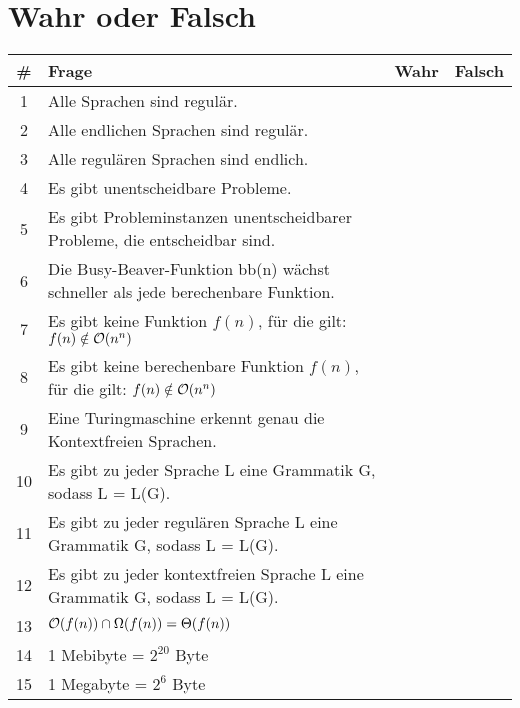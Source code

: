 \documentclass[a4paper,12pt]{article}
\begin{document}
\pagebreak

\section{Wahr oder Falsch}
\begin{table}[h]
	\begin{tabular}{| c | p{12 cm}  | c | c |}
	\hline
	\textbf{\#} & \textbf{Frage} & \textbf{Wahr} & \textbf{Falsch} \\
	\hline
	\hline
	1 & Alle Sprachen sind regulär.           &  \Square &  \Square \\
	\hline
	2 & Alle endlichen Sprachen sind regulär. &  \Square &  \Square \\
	\hline
	3 & Alle regulären Sprachen sind endlich. &  \Square &  \Square \\
	\hline
	4 & Es gibt unentscheidbare Probleme.     &  \Square &  \Square \\
	\hline
	5 & Es gibt Probleminstanzen unentscheidbarer Probleme, die entscheidbar sind.     &  \Square &  \Square \\
	\hline
	6 & Die Busy-Beaver-Funktion bb(n) wächst schneller als jede berechenbare Funktion. &  \Square &  \Square \\
	\hline
	7 & Es gibt keine Funktion $f(n)$, für die gilt: $f(n) \notin {\cal O}(n^n)$ &  \Square &  \Square \\
	\hline
	8 & Es gibt keine berechenbare Funktion $f(n)$, für die gilt: \newline $f(n) \notin {\cal O}(n^n)$ &  \Square &  \Square \\
	\hline
	9 & Eine Turingmaschine erkennt genau die Kontextfreien Sprachen. &  \Square &  \Square \\
	\hline
	10 & Es gibt zu jeder Sprache L eine Grammatik G, sodass L = L(G).  &  \Square &  \Square \\
	\hline
	11 & Es gibt zu jeder regulären Sprache L eine Grammatik G, \newline sodass L = L(G). &  \Square &  \Square \\
	\hline
	12 & Es gibt zu jeder kontextfreien Sprache L eine Grammatik G, \newline sodass L = L(G). &  \Square &  \Square \\
	\hline
	13 & ${\cal O}(f(n)) \cap \Omega(f(n)) = \Theta(f(n))$   &  \Square &  \Square \\
	\hline
	14 & 1 Mebibyte = $2^{20}$ Byte &  \Square &  \Square \\
	\hline
	15 & 1 Megabyte = $2^6$ Byte   &  \Square &  \Square \\

\end{tabular}
\end{table}
\end{document}
